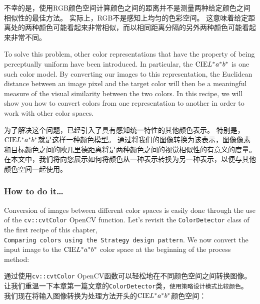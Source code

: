 \documentclass[]{article}
\begin{document}
不幸的是，使用RGB颜色空间计算颜色之间的距离并不是测量两种给定颜色之间相似性的最佳方法。
实际上，RGB不是感知上均匀的色彩空间。
这意味着给定距离处的两种颜色可能看起来非常相似，而以相同距离分隔的另外两种颜色可能看起来非常不同。

To solve this problem, other color representations that have the
property of being perceptually uniform have been introduced. In
particular, the \(\text{CIE} \space L^{*}a^{*}b^{*}\) is one such color
model. By converting our images to this representation, the Euclidean
distance between an image pixel and the target color will then be a
meaningful measure of the visual similarity between the two colors. In
this recipe, we will show you how to convert colors from one
representation to another in order to work with other color spaces.

为了解决这个问题，已经引入了具有感知统一特性的其他颜色表示。
特别是，\(\text{CIE} \space L^{*}a^{*}b^{*}\)就是这样一种颜色模型。
通过将我们的图像转换为该表示，图像像素和目标颜色之间的欧几里德距离将是两种颜色之间的视觉相似性的有意义的度量。
在本文中，我们将向您展示如何将颜色从一种表示转换为另一种表示，以便与其他颜色空间一起使用。

\hypertarget{header-n1337}{%
\subsubsection{How to do it\ldots{} }\label{header-n1337}}

Conversion of images between different color spaces is easily done
through the use of the \texttt{cv::cvtColor} OpenCV function. Let's
revisit the \texttt{ColorDetector} class of the first recipe of this
chapter,
\texttt{Comparing\ colors\ using\ the\ Strategy\ design\ pattern}. We
now convert the input image to the \(\text{CIE} \space L^{*}a^{*}b^{*}\)
color space at the beginning of the process method:

通过使用\texttt{cv::cvtColor}
OpenCV函数可以轻松地在不同颜色空间之间转换图像。
让我们重温一下本章第一篇文章的\texttt{ColorDetector}类，\texttt{使用策略设计模式比较颜色}。
我们现在将输入图像转换为处理方法开头的\( \text{CIE} \space L^{*} a^{*} b^{*} \)颜色空间：
\end{document}

